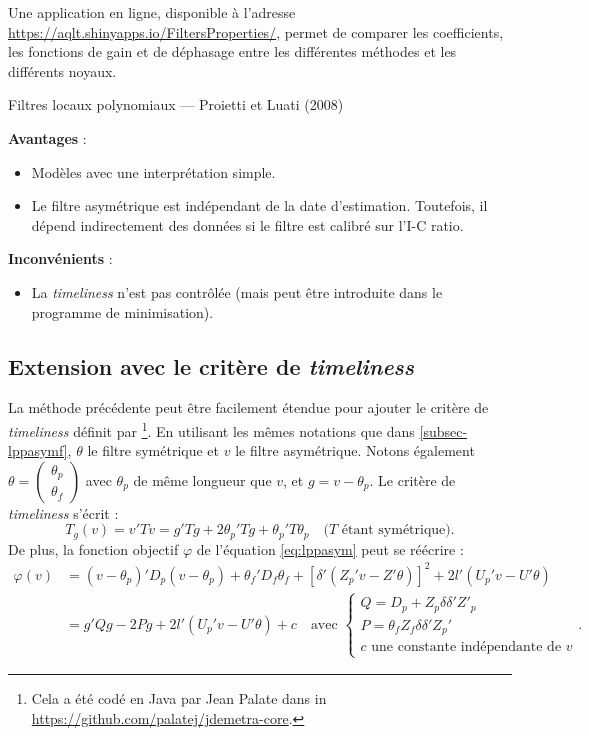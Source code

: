 \documentclass[
  11pt,
  french,
  a4paper]{article}
\providecommand{\tightlist}{%
  \setlength{\itemsep}{0pt}\setlength{\parskip}{0pt}}
\newcommand\1{\mathds{1}}
\begin{document}
Une application en ligne, disponible à l'adresse \url{https://aqlt.shinyapps.io/FiltersProperties/}, permet de comparer les coefficients, les fonctions de gain et de déphasage entre les différentes méthodes et les différents noyaux.

\begin{summary_box}{Filtres locaux polynomiaux --- Proietti et Luati (2008)}

\textbf{Avantages} :

\begin{itemize}
\item
  Modèles avec une interprétation simple.
\item
  Le filtre asymétrique est indépendant de la date d'estimation.
  Toutefois, il dépend indirectement des données si le filtre est calibré sur l'I-C ratio.
\end{itemize}

\textbf{Inconvénients} :

\begin{itemize}
\tightlist
\item
  La \emph{timeliness} n'est pas contrôlée (mais peut être introduite dans le programme de minimisation).
\end{itemize}

\end{summary_box}

\hypertarget{subsec-lptimeliness}{%
\subsection{\texorpdfstring{Extension avec le critère de \emph{timeliness}}{Extension avec le critère de timeliness}}\label{subsec-lptimeliness}}

La méthode précédente peut être facilement étendue pour ajouter le critère de \emph{timeliness} définit par \textcite{ch15HBSA}\footnote{Cela a été codé en Java par Jean Palate dans in \url{https://github.com/palatej/jdemetra-core}.}.
En utilisant les mêmes notations que dans \ref{subsec-lppasymf}, \(\theta\) le filtre symétrique et \(v\) le filtre asymétrique.
Notons également \(\theta=\begin{pmatrix}\theta_p\\\theta_f\end{pmatrix}\) avec \(\theta_p\) de même longueur que \(v\), et \(g=v-\theta_p\).
Le critère de \emph{timeliness} s'écrit :
\[
T_g(v)=v'Tv=g'Tg+2\theta_p'Tg+\theta_p'T\theta_p
\quad(T\text{ étant symétrique)}.
\]
De plus, la fonction objectif \(\varphi\) de l'équation \eqref{eq:lppasym} peut se réécrire :
\begin{align*}
\varphi(v)&=(v-\theta_p)'D_{p}(v-\theta_p)+
  \theta_f'D_{f}\theta_f+
  [\delta'(Z_{p}'v-Z'\theta)]^{2}+
2l'(U_{p}'v-U'\theta)\\
&=g'Qg-2Pg+2l'(U_{p}'v-U'\theta)+c\quad\text{avec }
\begin{cases}
Q=D_p+Z_p\delta\delta'Z'_p \\
P=\theta_fZ_f\delta\delta'Z_p'\\
c\text{ une constante indépendante de }v
\end{cases}.
\end{align*}
\end{document}
